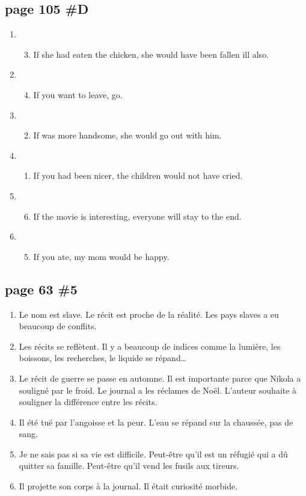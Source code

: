 \documentclass[letterpaper]{article}
\begin{document}
\subsection*{page 105 \#D}
\begin{enumerate}
\item
  \begin{enumerate}
  \setcounter{enumii}{2}
  \item
  If she had eaten the chicken, she would have been fallen ill also.
  \end{enumerate}
\item
  \begin{enumerate}
  \setcounter{enumii}{3}
  \item
  If you want to leave, go.
  \end{enumerate}
\item
  \begin{enumerate}
  \setcounter{enumii}{1}
  \item
  If was more handsome, she would go out with him.
  \end{enumerate}
\item
  \begin{enumerate}
  \setcounter{enumii}{0}
  \item
  If you had been nicer, the children would not have cried.
  \end{enumerate}
\item
  \begin{enumerate}
  \setcounter{enumii}{5}
  \item
  If the movie is interesting, everyone will stay to the end.
  \end{enumerate}
\item
  \begin{enumerate}
  \setcounter{enumii}{4}
  \item
  If you ate, my mom would be happy.
  \end{enumerate}
\end{enumerate}
\subsection*{page 63 \#5}
\begin{enumerate}
\item
Le nom est slave. Le récit est proche de la réalité. Les pays slaves a eu beaucoup de conflits.
\item
Les récits se reflètent. Il y a beaucoup de indices comme la lumière, les boissons, les recherches, le liquide se répand\dots
\item
Le récit de guerre se passe en automne. Il est importante parce que Nikola a souligné par le froid. Le journal a les réclames de Noël. L'auteur souhaite à souligner la différence entre les récits.
\item
Il été tué par l'angoisse et la peur. L'eau se répand sur la chaussée, pas de sang.
\item
Je ne sais pas si sa vie est difficile. Peut-être qu'il est un  réfugié qui a dû quitter sa famille. Peut-être qu'il vend les fusils aux tireurs.
\item
Il projette son corps à la journal. Il était curiosité morbide.
\end{enumerate}
\end{document}
